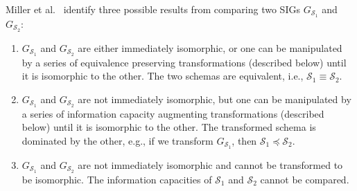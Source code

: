 \documentclass{sig-alternate-05-2015}
\newcommand{\SC}[1]{\ensuremath{\mathcal{S}_{#1}}}
\newcommand{\Dominates}[2]{\ensuremath{#2 \preceq #1}}
\begin{document}
Miller et al.\ \cite{Miller.R-1994a-SIG} identify three possible results from comparing two SIGs \(G_{\SC{1}}\) and \(G_{\SC{2}}\):
\begin{enumerate}
    
    \item \(G_{\SC{1}}\) and \(G_{\SC{2}}\) are either immediately isomorphic, or one can be manipulated by a series of equivalence preserving transformations (described below) until it is isomorphic to the other. The two schemas are equivalent, i.e., \(\SC{1} \equiv \SC{2}\).
    
    \item \(G_{\SC{1}}\) and \(G_{\SC{2}}\) are not immediately isomorphic, but one can be manipulated by a series of information capacity augmenting transformations (described below) until it is isomorphic to the other. The transformed schema is dominated by the other, e.g., if we transform \(G_{\SC{1}}\), then \(\Dominates{\SC{2}}{\SC{1}}\).
    
    \item \(G_{\SC{1}}\) and \(G_{\SC{2}}\) are not immediately isomorphic and cannot be transformed to be isomorphic. The information capacities of \(\SC{1}\) and \(\SC{2}\) cannot be compared.
    
\end{enumerate}
\end{document}
